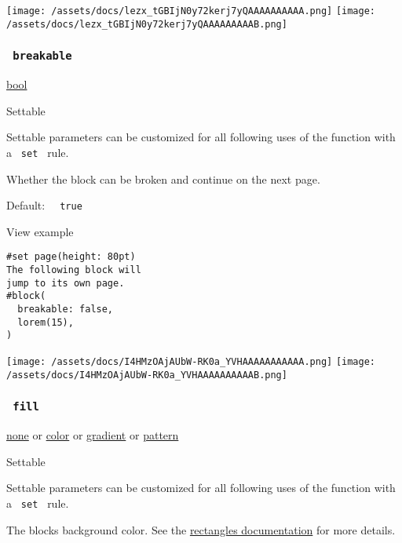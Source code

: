 \texttt{[image: /assets/docs/lezx\_tGBIjN0y72kerj7yQAAAAAAAAAA.png]}
\texttt{[image: /assets/docs/lezx\_tGBIjN0y72kerj7yQAAAAAAAAAB.png]}

\subsubsection{\texorpdfstring{\texttt{\ breakable\ }}{ breakable }}\label{parameters-breakable}

\href{/docs/reference/foundations/bool/}{bool}

{{ Settable }}

\label{parameters-breakable-settable-tooltip}
Settable parameters can be customized for all following uses of the
function with a \texttt{\ set\ } rule.

Whether the block can be broken and continue on the next page.

Default: \texttt{\ }{\texttt{\ true\ }}\texttt{\ }


View example

\begin{verbatim}
#set page(height: 80pt)
The following block will
jump to its own page.
#block(
  breakable: false,
  lorem(15),
)
\end{verbatim}

\texttt{[image: /assets/docs/I4HMzOAjAUbW-RK0a\_YVHAAAAAAAAAAA.png]}
\texttt{[image: /assets/docs/I4HMzOAjAUbW-RK0a\_YVHAAAAAAAAAAB.png]}

\subsubsection{\texorpdfstring{\texttt{\ fill\ }}{ fill }}\label{parameters-fill}

\href{/docs/reference/foundations/none/}{none} {or}
\href{/docs/reference/visualize/color/}{color} {or}
\href{/docs/reference/visualize/gradient/}{gradient} {or}
\href{/docs/reference/visualize/pattern/}{pattern}

{{ Settable }}

\label{parameters-fill-settable-tooltip}
Settable parameters can be customized for all following uses of the
function with a \texttt{\ set\ } rule.

The block\textquotesingle s background color. See the
\href{/docs/reference/visualize/rect/\#parameters-fill}{rectangle\textquotesingle s
documentation} for more details.

